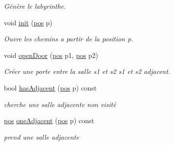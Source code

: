 \begin{DoxyCompactItemize}
\begin{DoxyCompactList}\small\item\em Génère le labyrinthe. \end{DoxyCompactList}\item 
void \hyperlink{class_labyrinth_a1589aae4f56635fd38d4704196571646}{init} (\hyperlink{structpos}{pos} p)
\begin{DoxyCompactList}\small\item\em Ouvre les chemins a partir de la position p. \end{DoxyCompactList}\item 
void \hyperlink{class_labyrinth_a1c81f6ddf4749788d5e97774c6970411}{open\-Door} (\hyperlink{structpos}{pos} p1, \hyperlink{structpos}{pos} p2)
\begin{DoxyCompactList}\small\item\em Créer une porte entre la salle s1 et s2 s1 et s2 adjacent. \end{DoxyCompactList}\item 
bool \hyperlink{class_labyrinth_a45c69cdcafe3665bd76db8e854b6e506}{has\-Adjacent} (\hyperlink{structpos}{pos} p) const 
\begin{DoxyCompactList}\small\item\em cherche une salle adjacente non visité \end{DoxyCompactList}\item 
\hyperlink{structpos}{pos} \hyperlink{class_labyrinth_a46038c2605eadda50894b070a012eb12}{one\-Adjacent} (\hyperlink{structpos}{pos} p) const 
\begin{DoxyCompactList}\small\item\em prend une salle adjacente \end{DoxyCompactList}\end{DoxyCompactItemize}
